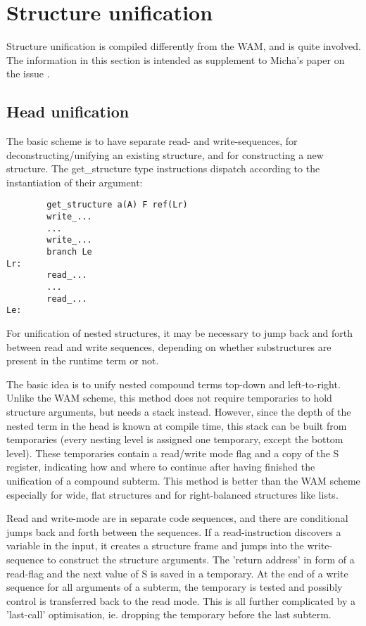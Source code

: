 \section{Structure unification}
\label{secstructunify}
Structure unification is compiled differently from the WAM, and is
quite involved. The information in this section is intended as
supplement to Micha's paper on the issue \cite{compnd}.

\subsection{Head unification}

The basic scheme is to have separate read- and write-sequences,
for deconstructing/unifying an existing structure, and for constructing
a new structure. The get_structure type instructions dispatch according
to the instantiation of their argument:
\begin{verbatim}
        get_structure a(A) F ref(Lr)
        write_...
        ...
        write_...
        branch Le
Lr:
        read_...
        ...
        read_...
Le:
\end{verbatim}
For unification of nested structures, it may be necessary to jump back
and forth between read and write sequences, depending on whether substructures
are present in the runtime term or not.

   The basic idea is to unify nested compound terms top-down and
   left-to-right. Unlike the WAM scheme, this method does not require
   temporaries to hold structure arguments, but needs a stack instead.
   However, since the depth of the nested term in the head is known
   at compile time, this stack can be built from temporaries (every
   nesting level is assigned one temporary, except the bottom level).
   These temporaries contain a read/write mode flag and a copy of the
   S register, indicating how and where to continue after having
   finished the unification of a compound subterm.
   This method is better than the WAM scheme especially for wide,
   flat structures and for right-balanced structures like lists.

   Read and write-mode are in separate code sequences, and there
   are conditional jumps back and forth between the sequences.
   If a read-instruction discovers a variable in the input, it
   creates a structure frame and jumps into the write-sequence to
   construct the structure arguments. The 'return address' in form
   of a read-flag and the next value of S is saved in a temporary.
   At the end of a write sequence for all arguments of a subterm,
   the temporary is tested and possibly control is transferred back
   to the read mode. This is all further complicated by a 'last-call'
   optimisation, ie. dropping the temporary before the last subterm.

